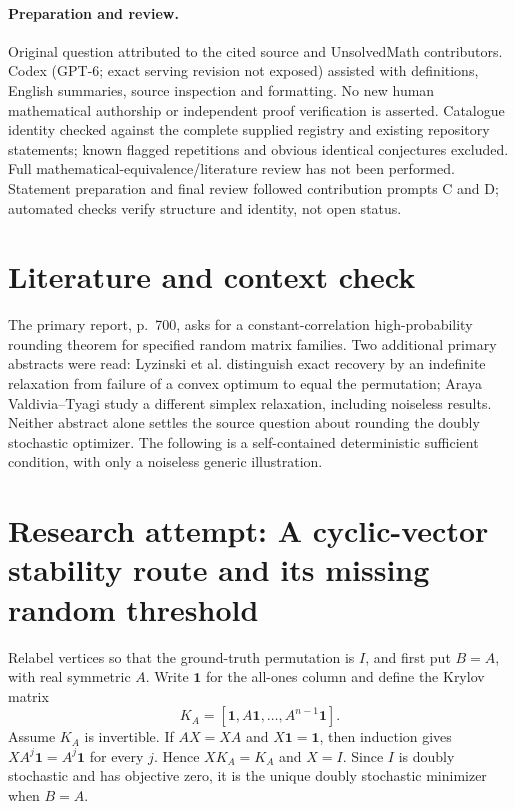 \documentclass[11pt]{article}
\begin{document}
\paragraph{Preparation and review.}
Original question attributed to the cited source and UnsolvedMath contributors. Codex (GPT-6; exact serving revision not exposed) assisted with definitions, English summaries, source inspection and formatting. No new human mathematical authorship or independent proof verification is asserted. Catalogue identity checked against the complete supplied registry and existing repository statements; known flagged repetitions and obvious identical conjectures excluded. Full mathematical-equivalence/literature review has not been performed. Statement preparation and final review followed contribution prompts C and D; automated checks verify structure and identity, not open status.
\label{end:statement}

\section{Literature and context check}
The primary report, p.~700, asks for a constant-correlation high-probability rounding theorem for specified random matrix families. Two additional primary abstracts were read: Lyzinski et al. distinguish exact recovery by an indefinite relaxation from failure of a convex optimum to equal the permutation; Araya Valdivia--Tyagi study a different simplex relaxation, including noiseless results. Neither abstract alone settles the source question about rounding the doubly stochastic optimizer. The following is a self-contained deterministic sufficient condition, with only a noiseless generic illustration.
\section{Research attempt: A cyclic-vector stability route and its missing random threshold}
Relabel vertices so that the ground-truth permutation is $I$, and first put $B=A$, with real symmetric $A$. Write $\mathbf1$ for the all-ones column and define the Krylov matrix
\[
 K_A=[\mathbf1,A\mathbf1,\ldots,A^{n-1}\mathbf1].
\]
Assume $K_A$ is invertible. If $AX=XA$ and $X\mathbf1=\mathbf1$, then induction gives $XA^j\mathbf1=A^j\mathbf1$ for every $j$. Hence $XK_A=K_A$ and $X=I$. Since $I$ is doubly stochastic and has objective zero, it is the unique doubly stochastic minimizer when $B=A$.
\end{document}
